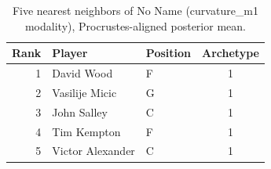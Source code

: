 \begin{table}[htbp]
  \centering\small
  \begin{tabular}{rllc}
    \toprule
    Rank & Player & Position & Archetype \\
    \midrule
    1 & David Wood & F & 1 \\
    2 & Vasilije Micic & G & 1 \\
    3 & John Salley & C & 1 \\
    4 & Tim Kempton & F & 1 \\
    5 & Victor Alexander & C & 1 \\
    \bottomrule
  \end{tabular}
  \caption{Five nearest neighbors of No Name (curvature_m1 modality), Procrustes-aligned posterior mean.}
  \label{tab:No_Name_neighbors_curvature_m1}
\end{table}

